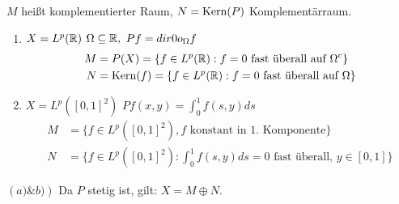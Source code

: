 \begin{vereinbarung}
	$M$ hei{\ss}t komplementierter Raum, $N = \mathop{\rm Kern}\nolimits(P)$ Komplementärraum.
\end{vereinbarung}


\begin{beispiel*}
	\begin{enumerate}[label=\alph*\upshape)]
		\item $X = L^{p}(\mathbb{R})$ $\Omega \subseteq \mathbb{R},$ $P f = \1_{\Omega} f$
			\begin{align*}
				M & = P(X) = \{ f \in L^{p}(\mathbb{R}): f = 0 \text{ fast überall auf } \Omega^{c} \} \\
				N & = \mathop{\rm Kern}\nolimits(f) = \{ f \in L^{p}(\mathbb{R}): f = 0 \text{ fast überall auf } \Omega \}
			\end{align*} 
		\item $X = L^{p}([0, 1]^{2})$ $P f(x, y) = \int_{0}^{1} f(s, y) ds$
			\begin{align*}
				M & = \{ f \in L^{p}([0, 1]^{2}), f \text{ konstant in 1. Komponente} \} \\
				N & = \{ f \in L^{p}([0, 1]^{2}): \int_{0}^{1} f(s, y) ds = 0 \text{ fast überall, } y \in [0, 1] \}
			\end{align*}
	\end{enumerate}
	$\left( a) \& b) \right)$ Da $P$ stetig ist, gilt: $X = M \oplus N$.
\end{beispiel*}



\newpage